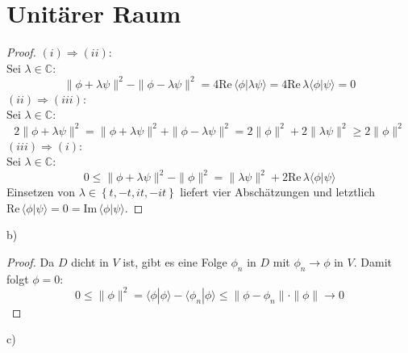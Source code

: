 \documentclass[a4paper,12pt]{article}
\newcommand{\brak}{}
\newcommand{\klammer}{}
\begin{document}
\section{Unitärer Raum}
\begin{proof}
$(i)\Rightarrow(ii)$:\\
Sei $\lambda\in\mathbb{C}$:
$$\|\phi+\lambda\psi\|^2-\|\phi-\lambda\psi\|^2=4\mathrm{Re\,}\brak\langle {\phi}| {\lambda\psi}\rangle=4\mathrm{Re\,}\lambda\brak\langle {\phi}| {\psi}\rangle=0$$
$(ii)\Rightarrow(iii)$:\\
Sei $\lambda\in\mathbb{C}$:
$$2\|\phi+\lambda\psi\|^2=\|\phi+\lambda\psi\|^2+\|\phi-\lambda\psi\|^2=2\|\phi\|^2+2\|\lambda\psi\|^2\ge 2\|\phi\|^2$$
$(iii)\Rightarrow(i)$:\\
Sei $\lambda\in\mathbb{C}$:
$$0\le\|\phi+\lambda\psi\|^2-\|\phi\|^2=\|\lambda\psi\|^2+2\mathrm{Re\,}\lambda\brak\langle {\phi}| {\psi}\rangle$$
Einsetzen von $\lambda\in\klammer\left\{ {t,-t,it,-it} \right\}$ liefert vier Abschätzungen und letztlich $\mathrm{Re\,}\brak\langle {\phi}| {\psi}\rangle=0=\mathrm{Im\,}\brak\langle {\phi}| {\psi}\rangle$.
\end{proof}
b)
\begin{proof}
Da $D$ dicht in $V$ ist, gibt es eine Folge $\phi_n$ in $D$ mit $\phi_n\rightarrow\phi$ in $V$. Damit folgt $\phi=0$:
$$0\le\|\phi\|^2=\brak\langle {\phi}| {\phi}\rangle-\brak\langle {\phi_n}| {\phi}\rangle\le\|\phi-\phi_n\|\cdot\|\phi\|\rightarrow 0$$
\end{proof}
c)
\end{document}
